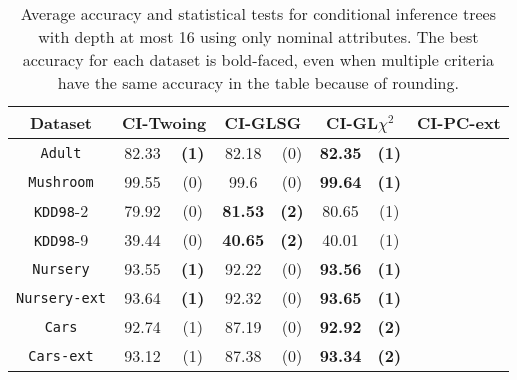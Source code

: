     \begin{table}
    \small
      \centering
        \caption{Average accuracy and statistical tests  for  conditional inference trees 
with depth at most 16 using only nominal attributes. The best accuracy for each dataset is bold-faced, even when multiple criteria have the same accuracy in the table because of rounding.}

\begin{tabular}{c|cc|cc|cc|cc} 
Dataset             & \multicolumn{2}{c|}{CI-Twoing} &   \multicolumn{2}{c|}{CI-GLSG} & \multicolumn{2}{c|}{CI-GL$\chi^2$} & \multicolumn{2}{c}{CI-PC-ext}\\  \hline   
{\tt Adult}         & 82.33      &  {\bf (1)}        &   82.18      & (0)             & {\bf 82.35} &  {\bf (1)}           &             &                \\
{\tt Mushroom}      &  99.55     &  (0)              &   99.6       & (0)             & {\bf 99.64} &  {\bf (1)}           &             &                \\
{\tt KDD98}-2       &79.92       &  (0)              &  {\bf 81.53} & {\bf (2)}       &  80.65      &  (1)                 &             &                \\
{\tt KDD98}-9       & 39.44      &  (0)              &  {\bf 40.65} & {\bf (2)}       &  40.01      &  (1)                 &             &                \\
{\tt Nursery}       & 93.55      &  {\bf (1)}        &   92.22      & (0)             & {\bf 93.56} &  {\bf (1)}           &             &                \\
{\tt Nursery-ext}   & 93.64      &  {\bf (1)}        &   92.32      & (0)             & {\bf 93.65} &  {\bf (1)}           &             &                \\
{\tt Cars}          & 92.74      &  (1)              &   87.19      & (0)             & {\bf 92.92} &  {\bf (2)}           &             &                \\
{\tt Cars-ext}      & 93.12      &  (1)              &   87.38      & (0)             & {\bf 93.34} &  {\bf (2)}           &             &                \\

\end{tabular}
\end{table}
